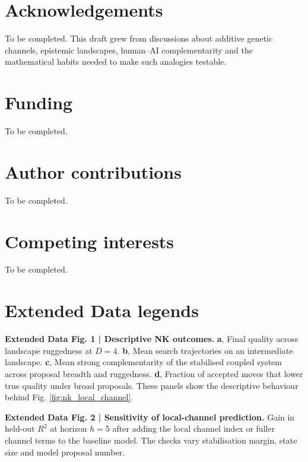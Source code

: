 \documentclass[11pt]{article}
\begin{document}
\section*{Acknowledgements}

To be completed. This draft grew from discussions about additive genetic channels, epistemic landscapes, human--AI complementarity and the mathematical habits needed to make such analogies testable.

\section*{Funding}

To be completed.

\section*{Author contributions}

To be completed.

\section*{Competing interests}

To be completed.

\section*{Extended Data legends}

\textbf{Extended Data Fig. 1 | Descriptive NK outcomes.} \textbf{a}, Final quality across landscape ruggedness at $D=4$. \textbf{b}, Mean search trajectories on an intermediate landscape. \textbf{c}, Mean strong complementarity of the stabilised coupled system across proposal breadth and ruggedness. \textbf{d}, Fraction of accepted moves that lower true quality under broad proposals. These panels show the descriptive behaviour behind Fig. \ref{fig:nk_local_channel}.

\textbf{Extended Data Fig. 2 | Sensitivity of local-channel prediction.} Gain in held-out $R^2$ at horizon $h=5$ after adding the local channel index or fuller channel terms to the baseline model. The checks vary stabilisation margin, state size and model proposal number.
\end{document}
